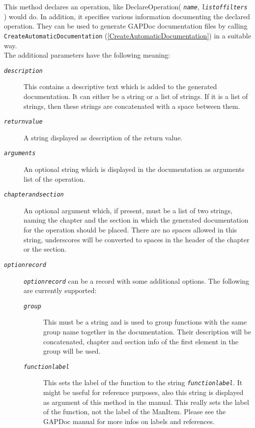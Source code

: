 \documentclass[a4paper,11pt]{report}
\begin{document}
{{{ This method declares an operation, like DeclareOperation( \mbox{\texttt{\mdseries\slshape name}}, \mbox{\texttt{\mdseries\slshape list{\textunderscore}of{\textunderscore}filters}} ) would do. In addition, it specifies various information documenting the
declared operation. They can be used to generate \textsf{GAPDoc} documentation files by calling \texttt{CreateAutomaticDocumentation} (\ref{CreateAutomaticDocumentation}) in a suitable way. \\
 The additional parameters have the following meaning: 
\begin{description}
\item[{\mbox{\texttt{\mdseries\slshape description}}}]  This contains a descriptive text which is added to the generated
documentation. It can either be a string or a list of strings. If it is a list
of strings, then these strings are concatenated with a space between them. 
\item[{\mbox{\texttt{\mdseries\slshape return{\textunderscore}value}}}]  A string displayed as description of the return value. 
\item[{\mbox{\texttt{\mdseries\slshape arguments}}}]  An optional string which is displayed in the documentation as arguments list
of the operation. 
\item[{\mbox{\texttt{\mdseries\slshape chapter{\textunderscore}and{\textunderscore}section}}}]  An optional argument which, if present, must be a list of two strings, naming
the chapter and the section in which the generated documentation for the
operation should be placed. There are no spaces allowed in this string,
underscores will be converted to spaces in the header of the chapter or the
section. 
\item[{\mbox{\texttt{\mdseries\slshape option{\textunderscore}record}}}]  \mbox{\texttt{\mdseries\slshape option{\textunderscore}record}} can be a record with some additional options. The following are currently
supported: 
\begin{description}
\item[{\mbox{\texttt{\mdseries\slshape group}}}]  This must be a string and is used to group functions with the same group name
together in the documentation. Their description will be concatenated, chapter
and section info of the first element in the group will be used. 
\item[{\mbox{\texttt{\mdseries\slshape function{\textunderscore}label}}}]  This sets the label of the function to the string \mbox{\texttt{\mdseries\slshape function{\textunderscore}label}}. It might be useful for reference purposes, also this string is displayed as
argument of this method in the manual. This really sets the label of the
function, not the label of the ManItem. Please see the \textsf{GAPDoc} manual for more infos on labels and references. 
\end{description}
 

\end{description}}}}
\end{document}

